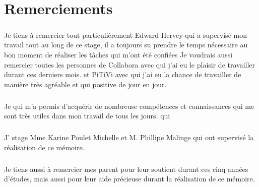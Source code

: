 \newpage \chapter*{Remerciements}

\paragraph {}

Je tiens à remercier tout particulièrement Edward Hervey qui a
supervisé mon travail tout au long de ce stage, il a toujours su prendre
le temps nécessaire au bon moment %
de réaliser les tâches qui m'ont été confiées%
Je voudrais aussi remercier toutes les personnes de Collabora
avec qui j'ai eu le plaisir de travailler durant ces derniers mois.
et PiTiVi avec qui j'ai eu la chance de travailler de manière très
agréable et qui %
positive de jour en jour.

\paragraph {}

Je %
qui m'a permis d'acquérir de nombreuse compétences et connaissances
qui me sont très utiles dans mon travail de tous les jours. %
qui %

\paragraph {}

J' %
stage Mme Karine Poulet Michelle et M. Phillipe Malinge qui ont
supervisé la réalisation de ce mémoire.

\paragraph {}

Je tiens aussi à remercier mes parent pour leur soutient durant ces
cinq années d'études, mais aussi pour leur aide précieuse durant la
réalisation de ce mémoire.
